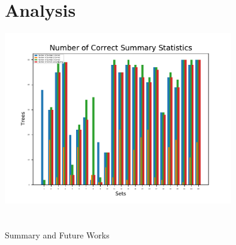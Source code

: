 \documentclass[
10pt,aspectratio=169,notheorems,hyperref={pdfauthor=whatever}
]{beamer}
\begin{document}
\section{Analysis}
\begin{frame}
  \centering
  \includegraphics[width=10cm, angle=0]{correctsumstats}
\end{frame}

\section{}
\begin{frame}
  \centering
  {\Large Summary and Future Works}
\end{frame}
\end{document}
